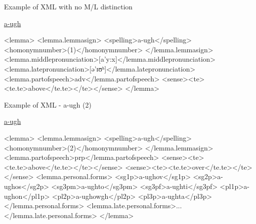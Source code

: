 \documentclass{beamer}
\begin{document}
\begin{frame}[fragile]{Example of XML with no M/L distinction}
\begin{scriptsize}
\href{http://www.cornishdictionary.org.uk/?locale=en#a-ugh}{a-ugh}
\begin{semiverbatim}
\color{gray}
<lemma>
<lemma.lemmasign>
<spelling>{\color{black}a-ugh}</spelling>
<homonymnumber>{\color{black}(1)}</homonymnumber>
</lemma.lemmasign>
<lemma.middlepronunciation>[a'y:x]</lemma.middlepronunciation>
<lemma.latepronunciation>[ə'ɪʊʰ]</lemma.latepronunciation>
<lemma.partofspeech>{\color{black}adv}</lemma.partofspeech>
<sense><te><te.te>{\color{black}above}</te.te></te></sense>
</lemma>
\end{semiverbatim}
\end{scriptsize}
\end{frame}
\begin{frame}[fragile]{Example of XML - a-ugh (2)}
\begin{tiny}
\href{http://www.cornishdictionary.org.uk/?locale=en#a-ugh}{a-ugh}
\begin{semiverbatim}
\color{gray}
<lemma>
<lemma.lemmasign>
<spelling>{\color{black}a-ugh}</spelling>
<homonymnumber>{\color{black}(2)}</homonymnumber>
</lemma.lemmasign>
<lemma.partofspeech>{\color{black}prp}</lemma.partofspeech>
<sense><te><te.te>{\color{black}above}</te.te></te></sense>
<sense><te><te.te>{\color{black}over}</te.te></te></sense>
<lemma.personal.forms>
<sg1p>a-ughov</sg1p>
<sg2p>a-ughos</sg2p>
<sg3pm>a-ughto</sg3pm>
<sg3pf>a-ughti</sg3pf>
<pl1p>a-ughon</pl1p>
<pl2p>a-ughowgh</pl2p>
<pl3p>a-ughta</pl3p>
</lemma.personal.forms>
<lemma.late.personal.forms>...</lemma.late.personal.forms>
</lemma>
\end{semiverbatim}
\end{tiny}
\end{frame}
\end{document}

